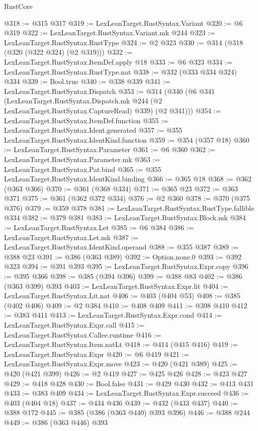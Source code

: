 \begin{lexlean}{RustCore}
\begin{coremodule}
@318 := @315 @317
@319 := LexLeanTarget.RustSyntax.Variant
@320 := @6 @319
@322 := LexLeanTarget.RustSyntax.Variant.mk @244
@323 := LexLeanTarget.RustSyntax.RustType
@324 := @2 @323
@330 := @314 (@318 (@320 (@322 @324) (@2 @319)))
@332 := LexLeanTarget.RustSyntax.ItemDef.apply @18
@333 := @6 @323
@334 := LexLeanTarget.RustSyntax.RustType.nat
@338 := @332 (@333 @334 @324) @334
@339 := Bool.true
@340 := @338 @339
@341 := LexLeanTarget.RustSyntax.Dispatch
@353 := @314
    (@340
      (@6
        @341
        (LexLeanTarget.RustSyntax.Dispatch.mk @244 (@2 LexLeanTarget.RustSyntax.CaptureRead) @339)
        (@2 @341)))
@354 := LexLeanTarget.RustSyntax.ItemDef.function
@355 := LexLeanTarget.RustSyntax.Ident.generated
@357 := @355 LexLeanTarget.RustSyntax.IdentKind.function
@359 := @354 (@357 @18)
@360 := LexLeanTarget.RustSyntax.Parameter
@361 := @6 @360
@362 := LexLeanTarget.RustSyntax.Parameter.mk
@363 := LexLeanTarget.RustSyntax.Pat.bind
@365 := @355 LexLeanTarget.RustSyntax.IdentKind.binding
@366 := @365 @18
@368 := @362 (@363 @366)
@370 := @361 (@368 @334)
@371 := @365 @23
@372 := @363 @371
@375 := @361 (@362 @372 @334)
@376 := @2 @360
@378 := @370 (@375 @376)
@379 := @359 @378
@381 := LexLeanTarget.RustSyntax.RustType.fallible @334
@382 := @379 @381
@383 := LexLeanTarget.RustSyntax.Block.mk
@384 := LexLeanTarget.RustSyntax.Let
@385 := @6 @384
@386 := LexLeanTarget.RustSyntax.Let.mk
@387 := LexLeanTarget.RustSyntax.IdentKind.operand
@388 := @355 @387
@389 := @388 @23
@391 := @386 (@363 @389)
@392 := Option.none.{0}
@393 := @392 @323
@394 := @391 @393
@395 := LexLeanTarget.RustSyntax.Expr.copy
@396 := @395 @366
@398 := @385 (@394 @396)
@399 := @388 @83
@402 := @386 (@363 @399) @393
@403 := LexLeanTarget.RustSyntax.Expr.lit
@404 := LexLeanTarget.RustSyntax.Lit.nat
@406 := @403 (@404 @53)
@408 := @385 (@402 @406)
@409 := @2 @384
@410 := @408 @409
@411 := @398 @410
@412 := @383 @411
@413 := LexLeanTarget.RustSyntax.Expr.cond
@414 := LexLeanTarget.RustSyntax.Expr.call
@415 := LexLeanTarget.RustSyntax.Callee.runtime
@416 := LexLeanTarget.RustSyntax.Item.natLt
@418 := @414 (@415 @416)
@419 := LexLeanTarget.RustSyntax.Expr
@420 := @6 @419
@421 := LexLeanTarget.RustSyntax.Expr.move
@423 := @420 (@421 @389)
@425 := @420 (@421 @399)
@426 := @2 @419
@427 := @425 @426
@428 := @423 @427
@429 := @418 @428
@430 := Bool.false
@431 := @429 @430
@432 := @413 @431
@433 := @383 @409
@434 := LexLeanTarget.RustSyntax.Expr.succeed
@436 := @403 (@404 @18)
@437 := @434 @436
@439 := @432 (@433 @437)
@440 := @388 @172
@445 := @385 (@386 (@363 @440) @393 @396)
@446 := @388 @244
@449 := @386 (@363 @446) @393

\end{coremodule}
\end{lexlean}
